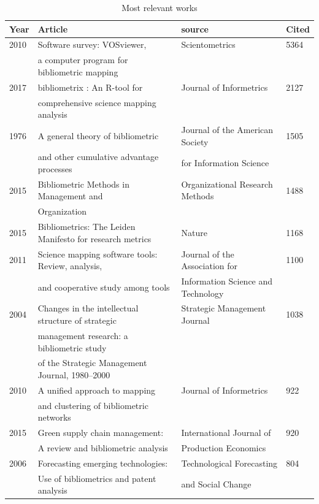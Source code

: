 \begin{table}[!ht]
\begin{footnotesize}
    \begin{tabular}{llll}
        Year & Article & source & Cited \\ \hline
        2010 & Software survey: VOSviewer,  & Scientometrics & 5364 \\ 
        ~ & a computer program for bibliometric mapping & ~ & ~ \\ 
        2017 & bibliometrix : An R-tool for  & Journal of Informetrics & 2127 \\ 
        ~ & comprehensive science mapping analysis & ~ & ~ \\ 
        1976 & A general theory of bibliometric  & Journal of the American Society  & 1505 \\ 
        ~ & and other cumulative advantage processes & for Information Science & ~ \\ 
        2015 & Bibliometric Methods in Management and  & Organizational Research Methods & 1488 \\ 
        ~ & Organization & ~ & ~ \\ 
        2015 & Bibliometrics: The Leiden Manifesto for research metrics & Nature & 1168 \\ 
        2011 & Science mapping software tools: Review, analysis,  & Journal of the Association for & 1100 \\ 
        ~ & and cooperative study among tools &  Information Science and Technology & ~ \\ 
        2004 &  Changes in the intellectual structure of strategic  & Strategic Management Journal & 1038 \\ 
        ~ & management research: a bibliometric study  & ~ & ~ \\ 
        ~ & of the Strategic Management Journal, 1980–2000 & ~ & ~ \\ 
        2010 & A unified approach to mapping & Journal of Informetrics & 922 \\ 
        ~ &  and clustering of bibliometric networks & ~ & ~ \\ 
        2015 & Green supply chain management:  & International Journal of  & 920 \\ 
        ~ & A review and bibliometric analysis & Production Economics & ~ \\ 
        2006 & Forecasting emerging technologies:  & Technological Forecasting  & 804 \\ 
        ~ & Use of bibliometrics and patent analysis & and Social Change & ~ \\ 
    \end{tabular}
    \end{footnotesize}
    \caption{Most relevant works}
    \label{tab:mrp}
    \end{table}


